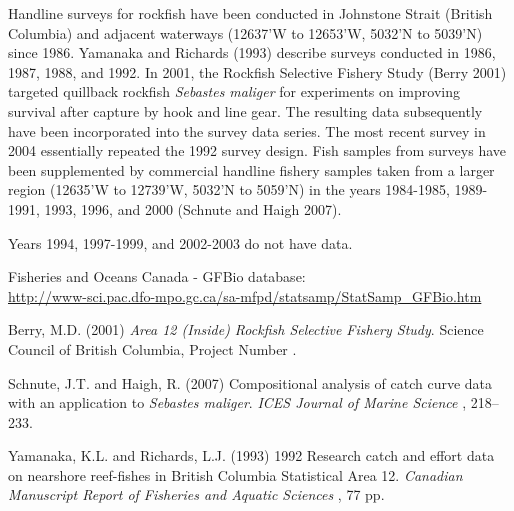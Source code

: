\documentclass[letterpaper]{book}
\begin{document}
\begin{Details}\relax
Handline surveys for rockfish have been conducted in 
Johnstone Strait (British Columbia) and adjacent waterways 
(126\eqn{^\circ}{}37'W to 126\eqn{^\circ}{}53'W, 
50\eqn{^\circ}{}32'N to 50\eqn{^\circ}{}39'N) since 1986. 
Yamanaka and Richards (1993) describe surveys conducted in 1986, 
1987, 1988, and 1992. In 2001, the Rockfish Selective Fishery 
Study (Berry 2001) targeted quillback rockfish \emph{Sebastes 
maliger} for experiments on improving survival after capture  by 
hook and line gear. The resulting data subsequently have been 
incorporated into the survey data series. The most recent survey 
in 2004 essentially repeated the 1992 survey design. Fish samples 
from surveys have been supplemented by commercial handline 
fishery samples taken from a larger region 
(126\eqn{^\circ}{}35'W to 127\eqn{^\circ}{}39'W, 
50\eqn{^\circ}{}32'N to 50\eqn{^\circ}{}59'N) in the years 
1984-1985, 1989-1991, 1993, 1996, and 2000 (Schnute and Haigh 
2007).
\end{Details}
%
\begin{Note}\relax
Years 1994, 1997-1999, and 2002-2003 do not have data.
\end{Note}
%
\begin{Source}\relax
Fisheries and Oceans Canada - GFBio database: \\{}
\url{http://www-sci.pac.dfo-mpo.gc.ca/sa-mfpd/statsamp/StatSamp_GFBio.htm}
\end{Source}
%
\begin{References}\relax
Berry, M.D. (2001) \emph{Area 12 (Inside) Rockfish Selective Fishery 
Study}. Science Council of British Columbia, Project Number .

Schnute, J.T. and Haigh, R. (2007) Compositional analysis of 
catch curve data with an application to \emph{Sebastes maliger}. 
\emph{ICES Journal of Marine Science} , 218--233.

Yamanaka, K.L. and Richards, L.J. (1993) 1992 Research catch and 
effort data on nearshore reef-fishes in British Columbia 
Statistical Area 12. \emph{Canadian Manuscript Report of Fisheries and 
Aquatic Sciences} , 77 pp.
\end{References}
%
\begin{Examples}
\end{Examples}
\end{document}
